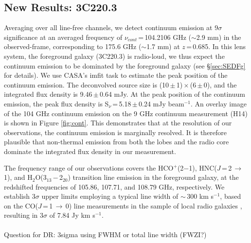 \documentclass[twocolumn,apj,numberedappendix]{emulateapj}
\newcommand{\pmOne}{\mbox{$^{-1}$}}
\begin{document}
\subsection{New Results: 3C220.3} 
Averaging over all line-free channels, we detect continuum emission at 9$\sigma$ significance at an averaged frequency of $\nu_{cont}$\,=\,104.2106 GHz ($\sim$2.9 mm) in the observed-frame, corresponding to 175.6 GHz ($\sim$1.7 mm) at $z$\,=\,0.685. In this lens system, the 
foreground galaxy (3C220.3) is radio-loud, we thus expect the continuum emission to be dominated by the foreground galaxy (see \S \ref{sec:SEDFg} for details). We use CASA's {\sc imfit} task to estimate the peak position of the continuum emission. The deconvolved source size is (10\,$\pm$\,1)\,$\times$\,(6\,$\pm$\,0), and the integrated flux density is 9.46\,$\pm$\,0.64\,\,mJy. At the peak position of the continuum emission, the peak flux density is S$_\nu$\,=\,5.18\,$\pm$\,0.24\,\,mJy\,\,beam\pmOne. An overlay image of the 104 GHz continuum emission on the 9 GHz continuum measurement (H14) is shown in Figure \ref{fig:cont}. This demonstrates that at the resolution of our observations, the continuum emission is marginally resolved. It is therefore plausible that non-thermal emission from both the lobes and the radio core dominate the integrated flux density in our measurement.

The frequency range of our observations covers the HCO$^+$(2$-$1), HNC($J$\,=\,2\,$\rightarrow$\,1), and H$_2$O(3$_{13}$\,$-$\,2$_{20}$) 
transition line emission in the foreground galaxy, at 
the redshifted frequencies of 105.86, 107.71, and 108.79\,\,GHz, respectively. We establish 3$\sigma$ upper limits employing a typical line width of 
$\sim$\,300\,\,km\,\,s\pmOne, based on the CO($J$\,=\,1\,$\rightarrow$\,0) line measurements in the sample of local radio galaxies \citep[$z$ $<$ 0.1; ][]{Smolcic11a}, resulting in 3$\sigma$ of 7.84\,\,Jy\,\,km\,\,s\pmOne.\\ \\
Question for DR: 3sigma using FWHM or total line width (FWZI?) 
\end{document}
